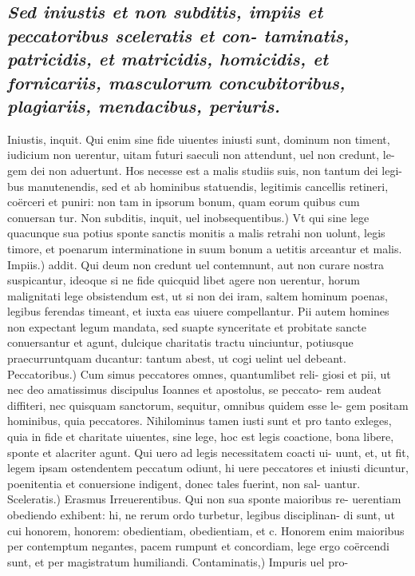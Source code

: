\documentclass{article}
\begin{document}
\begin{pages}
\subsection*{\textit{Sed iniustis et non subditis, impiis et peccatoribus sceleratis et con- taminatis, patricidis, et matricidis, homicidis, et fornicariis, masculorum concubitoribus, plagiariis, mendacibus, periuris. }}\pstart Iniustis, inquit. Qui enim sine fide uiuentes iniusti sunt, dominum non timent, iudicium non uerentur, uitam futuri saeculi non attendunt, uel non credunt, le- gem dei non aduertunt. Hos necesse est a malis studiis suis, non tantum dei legi- bus manutenendis, sed et ab hominibus statuendis, legitimis cancellis retineri, coërceri et puniri: non tam in ipsorum bonum, quam eorum quibus cum conuersan tur. Non subditis, inquit, uel inobsequentibus.) Vt qui sine lege quacunque sua potius sponte sanctis monitis a malis retrahi non uolunt, legis timore, et poenarum interminatione in suum bonum a uetitis arceantur et malis. Impiis.) addit. Qui deum non credunt uel contemnunt, aut non curare nostra suspicantur, ideoque si ne fide quicquid libet agere non uerentur, horum malignitati lege obsistendum est, ut si non dei iram, saltem hominum poenas, legibus ferendas timeant, et iuxta eas uiuere compellantur. Pii autem homines non expectant legum mandata, sed suapte synceritate et probitate sancte conuersantur et agunt, dulcique charitatis tractu uinciuntur, potiusque praecurruntquam ducantur: tantum abest, ut cogi uelint uel debeant. Peccatoribus.) Cum simus peccatores omnes, quantumlibet reli- giosi et pii, ut nec deo amatissimus discipulus Ioannes et apostolus, se peccato- rem audeat diffiteri, nec quisquam sanctorum, sequitur, omnibus quidem esse le- gem positam hominibus, quia peccatores. Nihilominus tamen iusti sunt et pro tanto exleges, quia in fide et charitate uiuentes, sine lege, hoc est legis coactione, bona libere, sponte et alacriter agunt. Qui uero ad legis necessitatem coacti ui- uunt, et, ut fit, legem ipsam ostendentem peccatum odiunt, hi uere peccatores et iniusti dicuntur, poenitentia et conuersione indigent, donec tales fuerint, non sal- uantur. Sceleratis.) Erasmus Irreuerentibus. Qui non sua sponte maioribus re- uerentiam obediendo exhibent: hi, ne rerum ordo turbetur, legibus disciplinan- di sunt, ut cui honorem, honorem: obedientiam, obedientiam, et c. Honorem enim maioribus per contemptum negantes, pacem rumpunt et concordiam, lege ergo coërcendi sunt, et per magistratum humiliandi. Contaminatis,) Impuris uel pro-  \pend

\end{pages}
\end{document}
